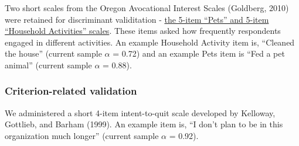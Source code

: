 \documentclass[
  man]{apa6}
\begin{document}
Two short scales from the Oregon Avocational Interest Scales (Goldberg, 2010) were retained for discriminant validitation - \href{https://ipip.ori.org/newORAISKey.htm\#Food-Related}{the 5-item ``Pets'' and 5-item ``Household Activities'' scales}. These items asked how frequently respondents engaged in different activities. An example Household Activity item is, ``Cleaned the house'' (current sample \(\alpha\) = 0.72) and an example Pets item is ``Fed a pet animal'' (current sample \(\alpha\) = 0.88).

\hypertarget{criterion-related-validation}{%
\subsubsection{Criterion-related validation}\label{criterion-related-validation}}

We administered a short 4-item intent-to-quit scale developed by Kelloway, Gottlieb, and Barham (1999). An example item is, ``I don't plan to be in this organization much longer'' (current sample \(\alpha\) = 0.92).
\end{document}
